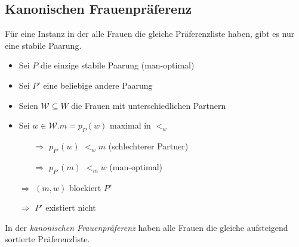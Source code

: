 \subsection{Kanonischen Frauenpräferenz}
\begin{frame}
  \begin{Lemma}
  \label{eine_paarung}
    Für eine Instanz in der alle Frauen die gleiche Präferenzliste haben, gibt es nur eine stabile Paarung.
  \end{Lemma}

  \begin{Beweis}
  \label{eine_paarung_bew}
    \begin{itemize}[<+->]
    	\item Sei $P$ die einzige stabile Paarung (man-optimal)
    	\item Sei $P'$ eine beliebige andere Paarung
    	\item Seien $\mathcal{W} \subseteq W$ die Frauen mit unterschiedlichen Partnern
      \item Sei $w \in \mathcal{W}. m = p_{P}(w)$ maximal in $<_{w}$
        \begin{itemize}
          \item[$\Longrightarrow$] $p_{P'}(w)$ $<_{w} m$ (schlechterer Partner)
          \item[$\Longrightarrow$] $p_{P'}(m)$ $<_{m} w$ (man-optimal)
        \end{itemize}
      \item[$\Longrightarrow$] $(m,w)$ blockiert $P'$
      \item[$\Longrightarrow$] $P'$ existiert nicht
    \end{itemize}
  \end{Beweis}
\end{frame}

\begin{frame}
  \begin{Definition}
  \label{kanonische_listen}
    In der \textit{kanonischen Frauenpräferenz} haben alle Frauen die gleiche aufsteigend sortierte Präferenzliste.
  \end{Definition}
\end{frame}

